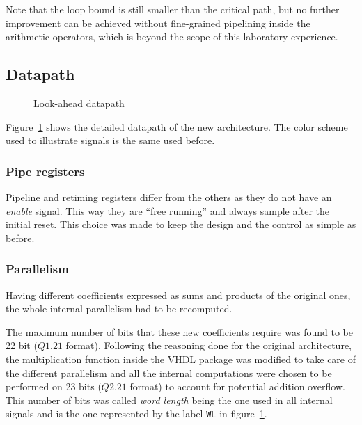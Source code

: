 \documentclass[a4paper]{article}
\begin{document}
Note that the loop bound is still smaller than the critical path, but no further improvement can be achieved without fine-grained pipelining inside the arithmetic operators, which is beyond the scope of this laboratory experience.

\subsection{Datapath}
\begin{figure}[hbtp]
    \centering
    \caption{Look-ahead datapath}
    \label{fig:pipelined_dp}
\end{figure}
Figure~\ref{fig:pipelined_dp} shows the detailed datapath of the new architecture. The color scheme used to illustrate signals is the same used before.

\subsubsection{Pipe registers}
Pipeline and retiming registers differ from the others as they do not have an \emph{enable} signal. This way they are ``free running'' and always sample after the initial reset. 
This choice was made to keep the design and the control as simple as before.

\subsubsection{Parallelism}
Having different coefficients expressed as sums and products of the original ones, the whole internal parallelism had to be recomputed. 

The maximum number of bits that these new coefficients require was found to be 22 bit ($Q1.21$ format). Following the reasoning done for the original architecture, the multiplication function inside the VHDL package was modified to take care of the different parallelism and all the internal computations were chosen to be performed on 23 bits ($Q2.21$ format) to account for potential addition overflow. This number of bits was called \emph{word length} being the one used in all internal signals and is the one represented by the label \texttt{WL} in figure~\ref{fig:pipelined_dp}.
\end{document}
